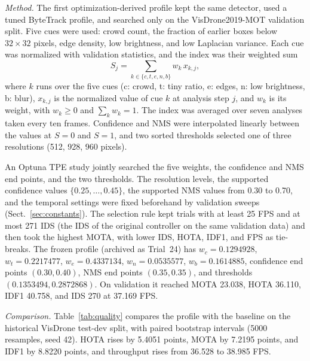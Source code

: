 \documentclass[pdflatex,sn-mathphys-num,iicol]{sn-jnl}
\begin{document}
\emph{Method.} The first optimization-derived profile kept the same detector,
used a tuned ByteTrack profile, and searched only on the VisDrone2019-MOT
validation split. Five cues were used: crowd count, the fraction of earlier
boxes below $32\times32$ pixels, edge density, low brightness, and low
Laplacian variance. Each cue was normalized with validation statistics, and
the index was their weighted sum
\begin{equation}
S_j=\sum_{k\in\{c,t,e,n,b\}}w_k\,x_{k,j},
\label{eq:hist-sci}
\end{equation}
where $k$ runs over the five cues (c: crowd, t: tiny ratio, e: edges, n: low
brightness, b: blur), $x_{k,j}$ is the normalized value of cue $k$ at analysis
step $j$, and $w_k$ is its weight, with $w_k\geq0$ and $\sum_k w_k=1$. The
index was averaged over seven analyses taken every ten frames. Confidence and NMS were interpolated linearly between the values
at $S=0$ and $S=1$, and two sorted thresholds selected one of three
resolutions (512, 928, 960 pixels).

An Optuna TPE study \cite{akiba2019optuna} jointly searched the five weights,
the confidence and NMS end points, and the two thresholds. The resolution
levels, the supported confidence values $\{0.25,\dots,0.45\}$, the supported
NMS values from 0.30 to 0.70, and the temporal settings were fixed beforehand
by validation sweeps (Sect.~\ref{sec:constants}). The selection rule kept
trials with at least 25 FPS and at most 271 IDS (the IDS of the original
controller on the same validation data) and then took the highest MOTA, with lower IDS, HOTA,
IDF1, and FPS as tie-breaks. The frozen profile (archived as Trial~24) has
$w_c=0.1294928$, $w_t=0.2217477$, $w_e=0.4337134$, $w_n=0.0535577$,
$w_b=0.1614885$, confidence end points $(0.30,0.40)$, NMS end points
$(0.35,0.35)$, and thresholds $(0.1353494, 0.2872868)$. On validation it
reached MOTA 23.038, HOTA 36.110, IDF1 40.758, and IDS 270 at 37.169 FPS.

\emph{Comparison.} Table~\ref{tab:quality} compares the profile with the
baseline on the historical VisDrone test-dev split, with paired bootstrap
intervals (5000 resamples, seed 42). HOTA rises by 5.4051 points, MOTA by
7.2195 points, and IDF1 by 8.8220 points, and throughput rises from 36.528 to
38.985 FPS.
\end{document}
